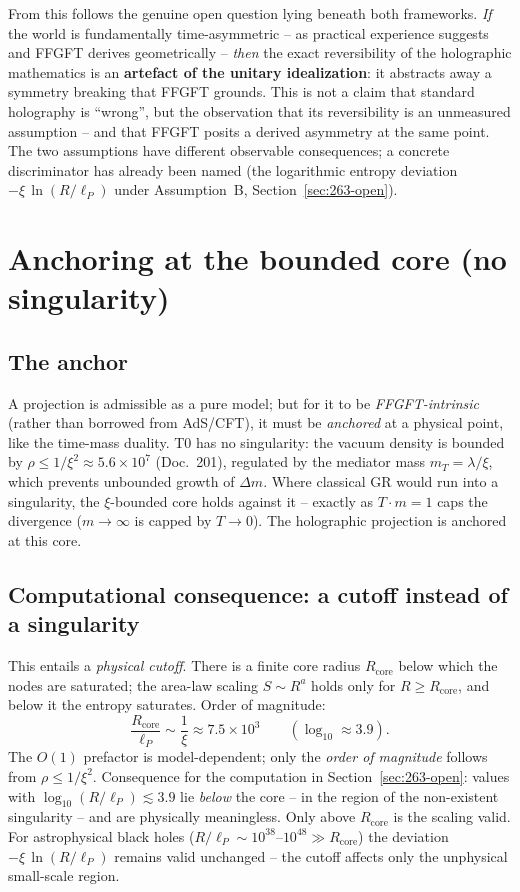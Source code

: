 From this follows the genuine open question lying beneath both frameworks.
\emph{If} the world is fundamentally time-asymmetric -- as practical
experience suggests and FFGFT derives geometrically -- \emph{then} the exact
reversibility of the holographic mathematics is an \textbf{artefact of the
unitary idealization}: it abstracts away a symmetry breaking that FFGFT
grounds. This is not a claim that standard holography is \enquote{wrong}, but
the observation that its reversibility is an unmeasured assumption -- and that
FFGFT posits a derived asymmetry at the same point. The two assumptions have
different observable consequences; a concrete discriminator has already been
named (the logarithmic entropy deviation $-\xi\,\ln(R/\ell_P)$ under
Assumption~B, Section~\ref{sec:263-open}).

\section{Anchoring at the bounded core (no singularity)}

\subsection*{The anchor}

A projection is admissible as a pure model; but for it to be
\emph{FFGFT-intrinsic} (rather than borrowed from AdS/CFT), it must be
\emph{anchored} at a physical point, like the time-mass duality. T0 has no
singularity: the vacuum density is bounded by
$\rho \le 1/\xi^2 \approx 5.6\times10^{7}$ (Doc.~201), regulated by the
mediator mass $m_T = \lambda/\xi$, which prevents unbounded growth of
$\Delta m$. Where classical GR would run into a singularity, the
$\xi$-bounded core holds against it -- exactly as $T\cdot m=1$ caps the
divergence ($m\to\infty$ is capped by $T\to 0$). The holographic projection is
anchored at this core.

\subsection*{Computational consequence: a cutoff instead of a singularity}

This entails a \emph{physical cutoff}. There is a finite core radius
$R_\text{core}$ below which the nodes are saturated; the area-law scaling
$S \sim R^{a}$ holds only for $R \ge R_\text{core}$, and below it the entropy
saturates. Order of magnitude:
\[
  \frac{R_\text{core}}{\ell_P} \sim \frac{1}{\xi} \approx 7.5\times10^{3}
  \qquad (\log_{10} \approx 3.9).
\]
The $O(1)$ prefactor is model-dependent; only the \emph{order of magnitude}
follows from $\rho \le 1/\xi^2$. Consequence for the computation in
Section~\ref{sec:263-open}: values with $\log_{10}(R/\ell_P) \lesssim 3.9$ lie
\emph{below} the core -- in the region of the non-existent singularity -- and
are physically meaningless. Only above $R_\text{core}$ is the scaling valid.
For astrophysical black holes ($R/\ell_P \sim 10^{38}\text{--}10^{48} \gg
R_\text{core}$) the deviation $-\xi\,\ln(R/\ell_P)$ remains valid unchanged --
the cutoff affects only the unphysical small-scale region.

